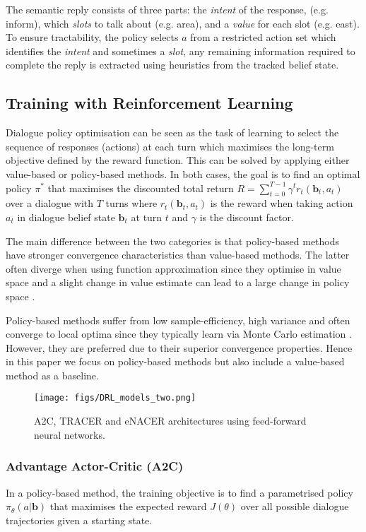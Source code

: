 \documentclass[11pt,a4paper]{article}
\begin{document}
The semantic reply consists of three parts: the {\it intent} of the response, (e.g. inform), which {\it slots} to talk about (e.g. area), and a {\it value} for each slot (e.g. east). 
To ensure tractability, the policy selects $a$ from a restricted action set which identifies the {\it intent} and sometimes a {\it slot}, any remaining information required to complete the reply is extracted using heuristics from the tracked belief state.

\subsection{Training with Reinforcement Learning}
\label{sec:rl}

Dialogue policy optimisation can be seen as the task of learning to select the sequence of responses (actions) at each turn
which maximises the long-term objective defined by the reward function. 
This can be solved by applying either value-based or policy-based methods.
In both cases, the goal is to find an optimal policy $\pi^*$ that maximises the discounted total return $R = \sum_{t=0}^{T-1} \gamma^t r_t(\mathbf{b}_t, a_t)$ over a dialogue with $T$ turns where $r_t(\mathbf{b}_t, a_t)$ is the reward when taking action $a_t$ in dialogue belief state $\mathbf{b}_t$ at turn $t$ and $\gamma$ is the discount factor. 

The main difference between the two categories is that policy-based methods have stronger convergence characteristics than value-based methods. The latter 
often diverge when using function approximation since they optimise in value space and a slight change in value estimate can lead to a large change in policy space \cite{sutton1999policy}. 

Policy-based methods suffer from low sample-efficiency, high variance and often converge to local optima since they typically learn via Monte Carlo estimation \cite{williams1992simple,schulman2015high}. However, they are preferred due to their superior convergence properties.
Hence in this paper we focus on policy-based methods but also
include a value-based method as a baseline.

\begin{figure}[t]
\centerline{\texttt{[image: figs/DRL\_models\_two.png]}}
\caption{A2C, TRACER and eNACER architectures using feed-forward neural networks.} 
\label{fig:DRLs}
\vspace{-4mm}
\end{figure}

\subsubsection{Advantage Actor-Critic (A2C)}
\label{sec:a2c}
In a policy-based method, the 
training objective is to find a parametrised policy $\pi_\theta(a|\mathbf{b})$ that maximises the expected 
reward $J(\theta)$ over all possible dialogue trajectories given a starting state.
\end{document}
